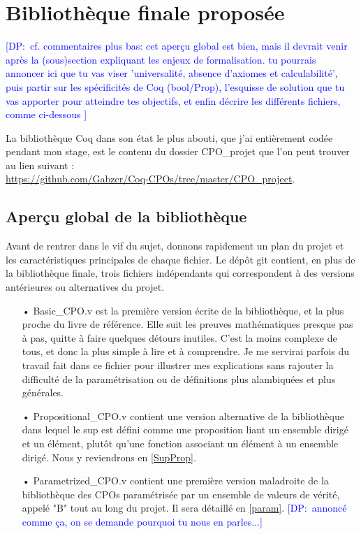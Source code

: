 \documentclass{article}
\newcommand\dam[1]{\textcolor{blue}{{[DP:~#1]}}}
\newcommand\code[1]{{\fontfamily{lmtt}\selectfont #1}}
\theoremstyle{definition}
\begin{document}
\newpage

\section{Bibliothèque finale proposée}
\dam{cf. commentaires plus bas: cet aperçu global est bien, mais il devrait venir après la (sous)section expliquant les enjeux de formalisation.
  tu pourrais annoncer ici que tu vas viser 'universalité, absence d'axiomes et calculabilité', puis partir sur les spécificités de Coq (bool/Prop), l'esquisse de solution que tu vas apporter pour atteindre tes objectifs, et enfin décrire les différents fichiers, comme ci-dessous
}

La bibliothèque Coq dans son état le plus abouti, que j'ai entièrement codée pendant mon stage, est le contenu du dossier \code{CPO\_projet} que l'on peut trouver au lien suivant :\\ \href{https://github.com/Gabzcr/Coq-CPOs/tree/master/CPO\_project}{https://github.com/Gabzcr/Coq-CPOs/tree/master/CPO\_project}.

\subsection{Aperçu global de la bibliothèque}

Avant de rentrer dans le vif du sujet, donnons rapidement un plan du projet et les caractéristiques principales de chaque fichier. Le dépôt git contient, en plus de la bibliothèque finale, trois fichiers indépendants qui correspondent à des versions antérieures ou alternatives du projet.

\medskip

\begin{itemize}
\item[•] \code{Basic\_CPO.v} est la première version écrite de la bibliothèque, et la plus proche du livre de référence. Elle suit les preuves mathématiques presque pas à pas, quitte à faire quelques détours inutiles. C'est la moins complexe de tous, et donc la plus simple à lire et à comprendre. Je me servirai parfois du travail fait dans ce fichier pour illustrer mes explications sans rajouter la difficulté de la paramétrisation ou de définitions plus alambiquées et plus générales.
\item[•] \code{Propositional\_CPO.v} contient une version alternative de la bibliothèque dans lequel le sup est défini comme une proposition liant un ensemble dirigé et un élément, plutôt qu'une fonction associant un élément à un ensemble dirigé. Nous y reviendrons en \ref{SupProp}.
\item[•] \code{Parametrized\_CPO.v} contient une première version maladroite de la bibliothèque des CPOs paramétrisée par un ensemble de valeurs de vérité, appelé "B" tout au long du projet. Il sera détaillé en \ref{param}.
\dam{annoncé comme ça, on se demande pourquoi tu nous en parles...}
\end{itemize}
\end{document}
